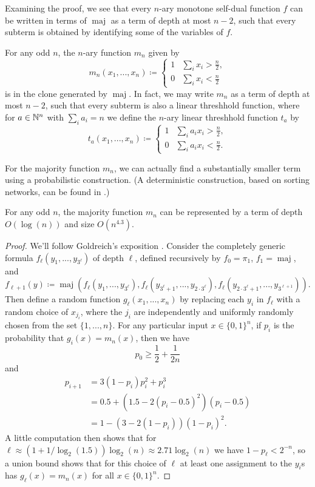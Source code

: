 \documentclass[letterpaper,11pt]{article}
\DeclareMathOperator{\maj}{maj}
\begin{document}
Examining the proof, we see that every $n$-ary monotone self-dual function $f$ can be written in terms of $\maj$ as a term of depth at most $n-2$, such that every subterm is obtained by identifying some of the variables of $f$.

\begin{cor} For any odd $n$, the $n$-ary function $m_n$ given by
\[
m_n(x_1, ..., x_n) \coloneqq \begin{cases}1 & \sum_i x_i > \frac{n}{2},\\ 0 & \sum_i x_i < \frac{n}{2}\end{cases}
\]
is in the clone generated by $\maj$. In fact, we may write $m_n$ as a term of depth at most $n-2$, such that every subterm is also a linear threshhold function, where for $a \in \mathbb{N}^n$ with $\sum_i a_i = n$ we define the $n$-ary linear threshhold function $t_a$ by
\[
t_a(x_1, ..., x_n) \coloneqq \begin{cases}1 & \sum_i a_ix_i > \frac{n}{2},\\ 0 & \sum_i a_ix_i < \frac{n}{2}.\end{cases}
\]
\end{cor}

For the majority function $m_n$, we can actually find a substantially smaller term using a probabilistic construction. (A deterministic construction, based on sorting networks, can be found in \cite{majority-sorting-networks}.)

\begin{prop} For any odd $n$, the majority function $m_n$ can be represented by a term of depth $O(\log(n))$ and size $O(n^{4.3})$.
\end{prop}
\begin{proof} We'll follow Goldreich's exposition \cite{goldreich-majority}. Consider the completely generic formula $f_\ell(y_1, ..., y_{3^\ell})$ of depth $\ell$, defined recursively by $f_0 = \pi_1$, $f_1 = \maj$, and
\[
f_{\ell+1}(y) \coloneqq \maj(f_\ell(y_1, ..., y_{3^\ell}), f_\ell(y_{3^\ell+1}, ..., y_{2\cdot 3^\ell}), f_\ell(y_{2\cdot 3^\ell+1}, ..., y_{3^{\ell+1}})).
\]
Then define a random function $g_{\ell}(x_1, ..., x_n)$ by replacing each $y_i$ in $f_\ell$ with a random choice of $x_{j_i}$, where the $j_i$ are independently and uniformly randomly chosen from the set $\{1, ..., n\}$. For any particular input $x \in \{0,1\}^n$, if $p_i$ is the probability that $g_i(x) = m_n(x)$, then we have
\[
p_0 \ge \frac{1}{2} + \frac{1}{2n}
\]
and
\begin{align*}
p_{i+1} &= 3(1-p_i)p_i^2 + p_i^3\\
&= 0.5 + (1.5 - 2(p_i-0.5)^2)(p_i-0.5)\\
&= 1 - (3 - 2(1-p_i))(1-p_i)^2.
\end{align*}
A little computation then shows that for $\ell \approx (1+1/\log_2(1.5))\log_2(n) \approx 2.71\log_2(n)$ we have $1-p_\ell < 2^{-n}$, so a union bound shows that for this choice of $\ell$ at least one assignment to the $y_i$s has $g_\ell(x) = m_n(x)$ for all $x \in \{0,1\}^n$.
\end{proof}
\end{document}
